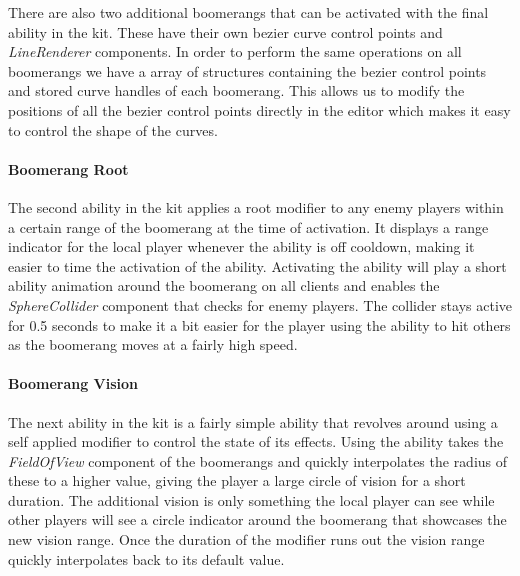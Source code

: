 There are also two additional boomerangs that can be activated with the final ability in the kit. These have their own bezier curve control points and \emph{LineRenderer} components.
In order to perform the same operations on all boomerangs we have a array of structures containing the bezier control points and stored curve handles of each boomerang. This allows us to modify the positions of all the bezier control points directly in the editor which makes it easy to control the shape of the curves.  

\paragraph{Boomerang Root}
The second ability in the kit applies a root modifier to any enemy players within a certain range of the boomerang at the time of activation. It displays a range indicator for the local player whenever the ability is off cooldown, making it easier to time the activation of the ability. Activating the ability will play a short ability animation around the boomerang on all clients and enables the \emph{SphereCollider} component that checks for enemy players. The collider stays active for 0.5 seconds to make it a bit easier for the player using the ability to hit others as the boomerang moves at a fairly high speed. 

\paragraph{Boomerang Vision}
The next ability in the kit is a fairly simple ability that revolves around using a self applied modifier to control the state of its effects. Using the ability takes the \emph{FieldOfView} component of the boomerangs and quickly interpolates the radius of these to a higher value, giving the player a large circle of vision for a short duration. The additional vision is only something the local player can see while other players will see a circle indicator around the boomerang that showcases the new vision range. Once the duration of the modifier runs out the vision range quickly interpolates back to its default value. 

